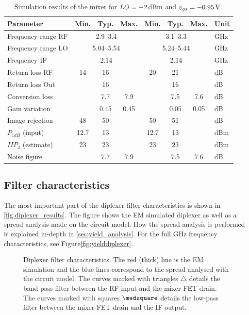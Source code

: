 			\begin{table}[hbt!]
				\caption[Simulation result of the mixer.]{Simulation results of the mixer for $LO=\unit[-2]{dBm}$ and $v_{gs}=\unit[-0.95]{V}$.\disclaimer}
				\label{tab:resultmixer}
				\centering
				\begin{tabular}{ l c c c c c c l } \toprule
					Parameter & Min. & Typ. & Max. & Min. & Typ. & Max. & Unit \\\midrule
					Frequency range RF & \multicolumn{3}{c}{2.9--3.4} & \multicolumn{3}{c}{3.1--3.3} & GHz \\
					Frequency range LO & \multicolumn{3}{c}{5.04--5.54} & \multicolumn{3}{c}{5.24--5.44} & GHz \\
					Frequency IF & \multicolumn{3}{c}{2.14} & \multicolumn{3}{c}{2.14} & GHz \\
					Return loss RF & 14 & 16 &  & 20 & 21 &  & dB \\
					Return loss Out & & 16 & & & 16 & & dB \\
					Conversion loss &  & 7.7 & 7.9 &  & 7.5 & 7.6 & dB \\
					Gain variation & & 0.45 & 0.45 & & 0.05 & 0.05 & dB \\
					Image rejection & 48 & 50 &  & 50 & 51 &  &  dB \\
					$P_{1dB}$ (input) & 12.7 & 13 &  & 12.7 & 13 &  & dBm \\
					$IIP_3$ (estimate) & 23 & 23 &  & 23 & 23 &  & dBm \\
					Noise figure &  & 7.7 & 7.9 &  & 7.5 & 7.6 & dB \\\bottomrule
				\end{tabular}
			\end{table}

		\subsection{Filter characteristics}
			The most important part of the diplexer filter characteristics is shown in \autoref{fig:diplexer_results}. The figure shows the EM simulated diplexer as well as a spread analysis made on the circuit model. How the spread analysis is performed is explained in-depth in \autoref{sec:yield_analysis}. For the full \unit[0--10]{GHz} frequency characteristics, see Figure\autoref{fig:yielddiplexer}.

			\begin{figure}[hbt!]
				\centering
				\caption[Diplexer filter characteristics.]{Diplexer filter characteristics. The red (thick) line is the EM simulation and the blue lines correspond to the spread analysed with the circuit model. The curves marked with triangles $\triangle$ details the band pass filter between the RF input and the mixer-FET drain. The curves marked with squares $\medsquare$ details the low-pass filter between the mixer-FET drain and the IF output.}\label{fig:diplexer_results}
			\end{figure}

